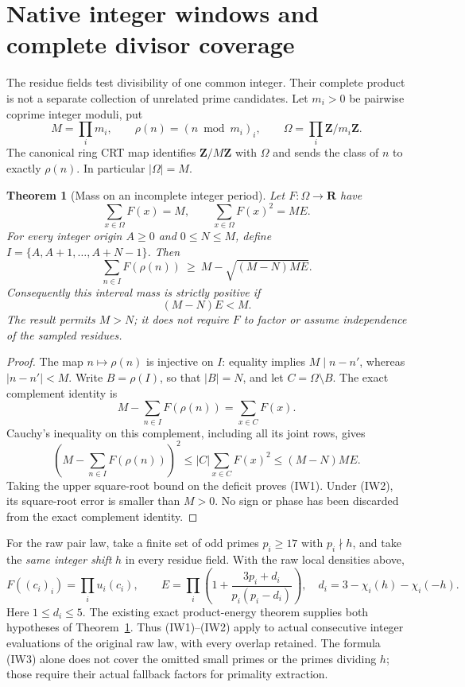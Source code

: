 \documentclass[11pt]{article}
\newtheorem{theorem}{Theorem}[section]
\begin{document}
\section{Native integer windows and complete divisor coverage}
\label{sec:integer-crt-pair-mass}
The residue fields test divisibility of one common integer. Their complete
product is not a separate collection of unrelated prime candidates.
Let \(m_i>0\) be pairwise coprime integer moduli, put
\[
 M=\prod_i m_i,\qquad
 \rho(n)=(n\bmod m_i)_i,\qquad
 \Omega=\prod_i\mathbf Z/m_i\mathbf Z.
\]
The canonical ring CRT map identifies \(\mathbf Z/M\mathbf Z\) with
\(\Omega\) and sends the class of \(n\) to exactly \(\rho(n)\).
In particular \(|\Omega|=M\).

\begin{theorem}[Mass on an incomplete integer period]
\label{thm:integer-subperiod-mass}
Let \(F:\Omega\to\mathbf R\) have
\[
 \sum_{x\in\Omega}F(x)=M,\qquad
 \sum_{x\in\Omega}F(x)^2=ME.
\]
For every integer origin \(A\ge0\) and \(0\le N\le M\), define
\(I=\{A,A+1,\ldots,A+N-1\}\). Then
\[
 \sum_{n\in I}F(\rho(n))
 \ \ge\ M-\sqrt{(M-N)ME}.
 \tag{IW1}
\]
Consequently this interval mass is strictly positive if
\[
                         (M-N)E<M.
 \tag{IW2}
\]
The result permits \(M>N\); it does not require \(F\) to factor or
assume independence of the sampled residues.
\end{theorem}
\begin{proof}
The map \(n\mapsto\rho(n)\) is injective on \(I\): equality implies
\(M\mid n-n'\), whereas \(|n-n'|<M\). Write \(B=\rho(I)\), so that
\(|B|=N\), and let \(C=\Omega\setminus B\). The exact complement identity is
\[
 M-\sum_{n\in I}F(\rho(n))=\sum_{x\in C}F(x).
\]
Cauchy's inequality on this complement, including all its joint rows, gives
\[
 \left(M-\sum_{n\in I}F(\rho(n))\right)^2
 \le |C|\sum_{x\in C}F(x)^2
 \le (M-N)ME.
\]
Taking the upper square-root bound on the deficit proves (IW1).
Under (IW2), its square-root error is smaller than \(M>0\).
No sign or phase has been discarded from the exact complement identity.
\end{proof}

For the raw pair law, take a finite set of odd primes \(p_i\ge17\)
with \(p_i\nmid h\), and take the \emph{same integer shift} \(h\) in
every residue field. With the raw local densities above,
\[
 F((c_i)_i)=\prod_i u_i(c_i),\qquad
 E=\prod_i\left(1+\frac{3p_i+d_i}{p_i(p_i-d_i)}\right),
 \quad d_i=3-\chi_i(h)-\chi_i(-h).
 \tag{IW3}
\]
Here \(1\le d_i\le5\). The existing exact product-energy theorem
supplies both hypotheses of Theorem~\ref{thm:integer-subperiod-mass}.
Thus (IW1)--(IW2) apply to actual consecutive integer evaluations of
the original raw law, with every overlap retained. The formula (IW3)
alone does not cover the omitted small primes or the primes dividing
\(h\); those require their actual fallback factors for primality extraction.
\end{document}
